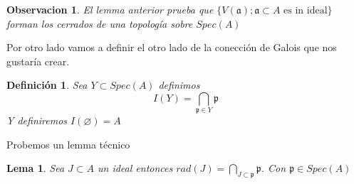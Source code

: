 \documentclass{article}
\newtheorem{definition}{Definición}
\newtheorem{lemma}{Lema}
\newtheorem{observation}{Observacion}
\begin{document}
\begin{observation}
    El lemma anterior prueba que $\{V(\mathfrak{a}); \mathfrak{a} \subset A \mbox{ es in ideal}\}$
    forman los cerrados de una topología sobre $Spec(A)$
\end{observation}

Por otro lado vamos a definir el otro lado de la conección de 
Galois que nos gustaría crear.

\begin{definition}
    Sea $Y \subset Spec(A)$ definimos
    $$I(Y) = \bigcap_{\mathfrak{p}\in Y} \mathfrak{p}$$
    Y definiremos $I(\varnothing) = A$
\end{definition}

Probemos un lemma técnico
\begin{lemma}
    Sea $J \subset A$ un ideal entonces
    $rad(J) = \bigcap_{J \subset\mathfrak{p}} \mathfrak{p}$.
    Con $\mathfrak{p} \in Spec(A)$
\end{lemma}
\end{document}
